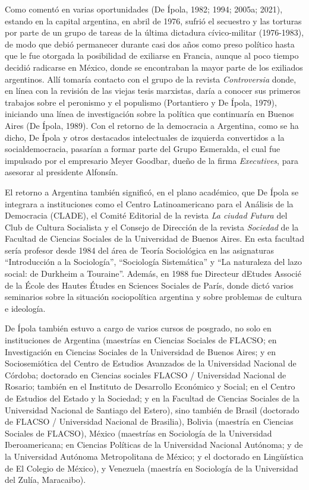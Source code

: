 Como comentó en varias oportunidades (De Ípola, 1982; 1994; 2005a; 2021), estando en la capital argentina, en abril de 1976, sufrió el secuestro y las torturas por parte de un grupo de tareas de la última dictadura cívico-militar (1976-1983), de modo que debió permanecer durante casi dos años como preso político hasta que le fue otorgada la posibilidad de exiliarse en Francia, aunque al poco tiempo decidió radicarse en México, donde se encontraban la mayor parte de los exiliados argentinos. Allí tomaría contacto con el grupo de la revista \emph{Controversia} donde, en línea con la revisión de las viejas tesis marxistas, daría a conocer sus primeros trabajos sobre el peronismo y el populismo (Portantiero y De Ípola, 1979), iniciando una línea de investigación sobre la política que continuaría en Buenos Aires (De Ípola, 1989). Con el retorno de la democracia a Argentina, como se ha dicho, De Ípola y otros destacados intelectuales de izquierda convertidos a la socialdemocracia, pasarían a formar parte del Grupo Esmeralda, el cual fue impulsado por el empresario Meyer Goodbar, dueño de la firma \emph{Executives}, para asesorar al presidente Alfonsín.

El retorno a Argentina también significó, en el plano académico, que De Ípola se integrara a instituciones como el Centro Latinoamericano para el Análisis de la Democracia (CLADE), el Comité Editorial de la revista \emph{La ciudad Futura} del Club de Cultura Socialista y el Consejo de Dirección de la revista \emph{Sociedad} de la Facultad de Ciencias Sociales de la Universidad de Buenos Aires. En esta facultad sería profesor desde 1984 del área de Teoría Sociológica en las asignaturas ``Introducción a la Sociología'', ``Sociología Sistemática'' y ``La naturaleza del lazo social: de Durkheim a Touraine''. Además, en 1988 fue Directeur d\textquotesingle Etudes Associé de la École des Hautes Études en Sciences Sociales de París, donde dictó varios seminarios sobre la situación sociopolítica argentina y sobre problemas de cultura e ideología.

De Ípola también estuvo a cargo de varios cursos de posgrado, no solo en instituciones de Argentina (maestrías en Ciencias Sociales de FLACSO; en Investigación en Ciencias Sociales de la Universidad de Buenos Aires; y en Sociosemiótica del Centro de Estudios Avanzados de la Universidad Nacional de Córdoba; doctorado en Ciencias sociales FLACSO / Universidad Nacional de Rosario; también en el Instituto de Desarrollo Económico y Social; en el Centro de Estudios del Estado y la Sociedad; y en la Facultad de Ciencias Sociales de la Universidad Nacional de Santiago del Estero), sino también de Brasil (doctorado de FLACSO / Universidad Nacional de Brasilia), Bolivia (maestría en Ciencias Sociales de FLACSO), México (maestrías en Sociología de la Universidad Iberoamericana; en Ciencias Políticas de la Universidad Nacional Autónoma; y de la Universidad Autónoma Metropolitana de México; y el doctorado en Lingüística de El Colegio de México), y Venezuela (maestría en Sociología de la Universidad del Zulía, Maracaibo).


